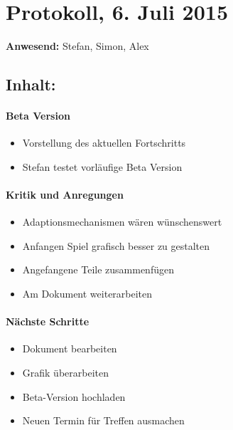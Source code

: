 \documentclass[a4paper,11pt]{article}
\begin{document}
\section*{Protokoll, 6. Juli 2015}

\textbf{Anwesend:} Stefan, Simon, Alex

\subsection*{Inhalt:}

\paragraph{Beta Version}
\begin{itemize}
  \item Vorstellung des aktuellen Fortschritts
  \item Stefan testet vorläufige Beta Version
\end{itemize}
\paragraph{Kritik und Anregungen}
\begin{itemize}
  \item Adaptionsmechanismen wären wünschenswert
  \item Anfangen Spiel grafisch besser zu gestalten
  \item Angefangene Teile zusammenfügen
  \item Am Dokument weiterarbeiten
\end{itemize}

\paragraph{Nächste Schritte}
\begin{itemize}
  \item Dokument bearbeiten 
  \item Grafik überarbeiten
  \item Beta-Version hochladen
  \item Neuen Termin für Treffen ausmachen
\end{itemize}
\end{document}
